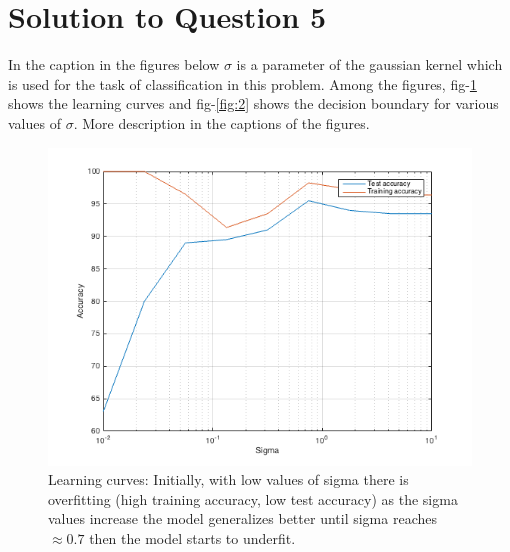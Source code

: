 \documentclass[a4paper,11pt]{article}
\begin{document}
\section{Solution to Question 5}
In the caption in the figures below $\sigma$ is a parameter of the gaussian kernel which is used for the task of classification in this problem. Among the figures, fig-\ref{fig:1} shows the learning curves and fig-\ref{fig:2} shows the decision boundary for various values of $\sigma$. More description in the captions of the figures.
\begin{figure}[ht!]
    \centering
    \includegraphics[scale=0.7]{learning_curves.png}
    \caption{Learning curves: Initially, with low values of sigma there is overfitting (high training accuracy, low test accuracy) as the sigma values increase the model generalizes better until sigma reaches $\approx 0.7$ then the model starts to underfit.}
    \label{fig:1}
\end{figure}
\end{document}
